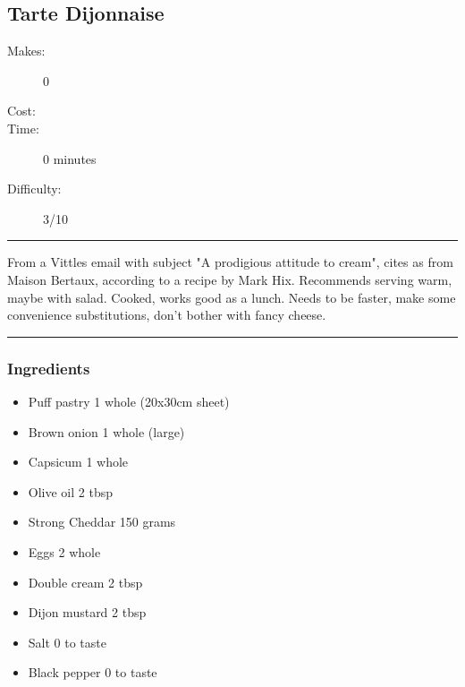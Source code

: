\documentclass[]{article}
\begin{document}
\subsection*{\center\huge Tarte Dijonnaise}
\begin{description}
\item[Makes:] 0 
\item[Cost:] \textdollar
\item[Time:] 0 minutes
\item[Difficulty:] 3/10
\end{description}
\vspace{0.2cm}\hrule\vspace{0.5cm}
\begin{adjustwidth}{0.5 cm}{0.5 cm}

From a Vittles email with subject "A prodigious attitude to cream", cites as from Maison Bertaux, according to a recipe by Mark Hix. Recommends serving warm, maybe with salad. Cooked, works good as a lunch. Needs to be faster, make some convenience substitutions, don't bother with fancy cheese. \hfill{}\color{black}

\end{adjustwidth}
\vspace{0.5cm}\hrule
\subsubsection*{\Large Ingredients}
\begin{multicols}{2}
\begin{itemize}
 \item Puff pastry \hfill 1 whole (20x30cm sheet)
 \item Brown onion \hfill 1 whole (large)
 \item Capsicum \hfill 1 whole
 \item Olive oil \hfill 2 tbsp
 \item Strong Cheddar \hfill 150 grams
 \item Eggs \hfill 2 whole
 \item Double cream \hfill 2 tbsp
 \item Dijon mustard \hfill 2 tbsp
 \item Salt \hfill 0 to taste
 \item Black pepper \hfill 0 to taste
\end{itemize}
\end{multicols}
\end{document}
